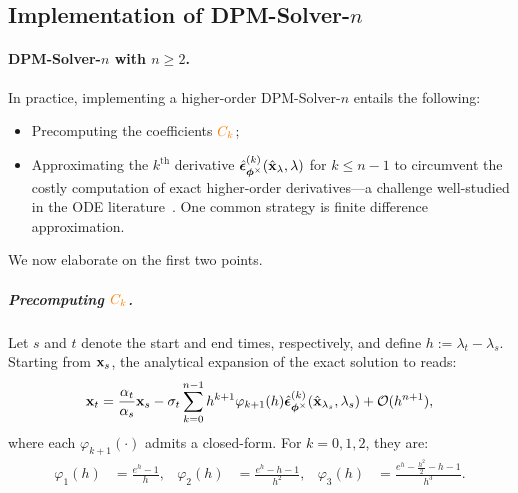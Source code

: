  
\subsection{Implementation of DPM-Solver-$n$}\label{subsec:dpm-n-method} 

\paragraph{DPM-Solver-$n$ with $n \geq 2$.}
In practice, implementing a higher-order DPM-Solver-$n$ entails the following:
\begin{itemize}
    \item Precomputing the coefficients ${\color{orange}C_k}$;
    \item Approximating the $k^{\text{th}}$ derivative {\color{cyan}$\hat{\bm{\epsilon}}_{\bm{\phi}^\times}^{(k)}(\hat{{\mathbf{x}}}_\lambda,\lambda)$} for $k \leq n-1$ to circumvent the costly computation of exact higher-order derivatives—a challenge well-studied in the ODE literature~\citep{hochbruck2005explicit,luan2021efficient}. One common strategy is finite difference approximation.
\end{itemize}

We now elaborate on the first two points.


\subparagraph{Precomputing ${\color{orange}C_k}$.} 
Let $s$ and $t$ denote the start and end times, respectively, and define $h := \lambda_t - \lambda_s$. Starting from ${\mathbf{x}}_s$, the analytical expansion of the exact solution to  reads:
\begin{equation}
\label{eq:analytic_expansion}
    {\mathbf{x}}_{t} = \frac{\alpha_{t}}{\alpha_{s}}{\mathbf{x}}_{s} - \sigma_{t} \sum_{k=0}^{n-1} h^{k+1} \varphi_{k+1}(h) \hat{\bm{\epsilon}}_{\bm{\phi}^\times}^{(k)}(\hat{{\mathbf{x}}}_{\lambda_{s}}, \lambda_{s}) + \mathcal{O}(h^{n+1}),
\end{equation}
where each $\varphi_{k+1}(\cdot)$ admits a closed-form. For $k = 0, 1, 2$, they are:
\begin{align*}
\varphi_1(h) &= \frac{e^h - 1}{h}, &
\varphi_2(h) &= \frac{e^h - h - 1}{h^2}, &
\varphi_3(h) &= \frac{e^h - \frac{h^2}{2} - h - 1}{h^3}.
\end{align*}

